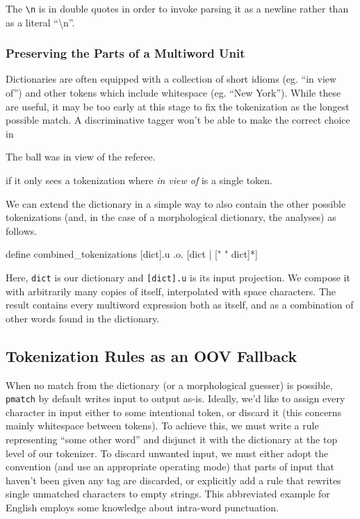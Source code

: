\documentclass{llncs}
\begin{document}
The \verb+\n+ is in double quotes in order to invoke parsing it as a newline
rather than as a literal ``\textbackslash n''.

\subsubsection{Preserving the Parts of a Multiword Unit}

Dictionaries are often equipped with a collection of short idioms (eg.\@
``in view of'') and other tokens which include whitespace (eg.\@
``New York''). While these are useful, it may be too early at this stage
to fix the tokenization as the longest possible match. A discriminative
tagger won't be able to make the correct choice in

\begin{exe}
  \item The ball was in view of the referee.
\end{exe}

if it only sees a tokenization where \emph{in view of} is a single token.

We can extend the dictionary in a simple way to also contain the other
possible tokenizations (and, in the case of a morphological dictionary,
the analyses) as follows.

\begin{verb}
define combined_tokenizations [dict].u .o. [dict | [" " dict]*]  
\end{verb}

Here, \verb+dict+ is our dictionary and \verb+[dict].u+ is its input
projection. We compose it with arbitrarily many copies of itself,
interpolated with space characters. The result contains every multiword
expression both as itself, and as a combination of other words found
in the dictionary.

\subsection{Tokenization Rules as an OOV Fallback}

When no match from the dictionary (or a morphological guesser) is possible,
\verb+pmatch+ by default
writes input to output as-is. Ideally, we'd like to assign every character
in input either to some intentional token, or discard it (this concerns mainly
whitespace between tokens). To achieve this, we must write a rule representing
``some other word'' and disjunct it with the dictionary at the top level of
our tokenizer. To discard unwanted input, we must either adopt the convention
(and use an appropriate operating mode) that parts of input that haven't been
given any tag are discarded, or explicitly add a rule that rewrites single
unmatched characters to empty strings. This abbreviated example for English
employs some knowledge about intra-word punctuation.
\end{document}
